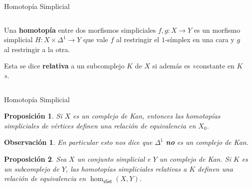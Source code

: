 \documentclass[11pt]{beamer}
\newcommand{\cat}[1]{\mathsf{#1}}
\renewcommand{\ss}[1]{\Delta^{#1}}
\newcommand{\guill}[1]{«#1»}
\newtheorem{prop}{Proposición}
\newtheorem{obs}{Observación}
\begin{document}
\begin{frame}{Homotopía Simplicial}
\begin{columns}
\begin{column}{0.5\textwidth}
\vspace{5pt}

Una \textbf{homotopía} entre dos morfismos simpliciales $f,g : X \to Y$ es un morfismo simplicial $H : X \times \ss{1} \to Y$ que vale $f$ al restringir el $1$-símplex en una cara y $g$ al restringir a la otra.
\vspace{30pt}

Esta se dice \textbf{relativa} a un subcomplejo $K$ de $X$ si además es \guill{constante en $K$}.
\end{column} 
\begin{column}{0.5\textwidth}  \begin{center}
\end{center}
\begin{center}
\end{center}
\end{column}
\end{columns}
\end{frame}

\begin{frame}{Homotopía Simplicial}
\begin{prop} Si $X$ es un complejo de Kan, entonces las homotopías simpliciales de vértices definen una relación de equivalencia en $X_0$.
\end{prop}
\begin{obs} En particular esto nos dice que $\ss{1}$ \textbf{no} es un complejo de Kan.
\end{obs}
\begin{prop} Sea $X$ un conjunto simplicial e $Y$ un complejo de Kan. Si $K$ es un subcomplejo de $Y$, las homotopías simpliciales relativas a $K$ definen una relación de equivalencia en $\hom_{\cat{sSet}}(X,Y)$.
\end{prop}
\end{frame}
\end{document}

